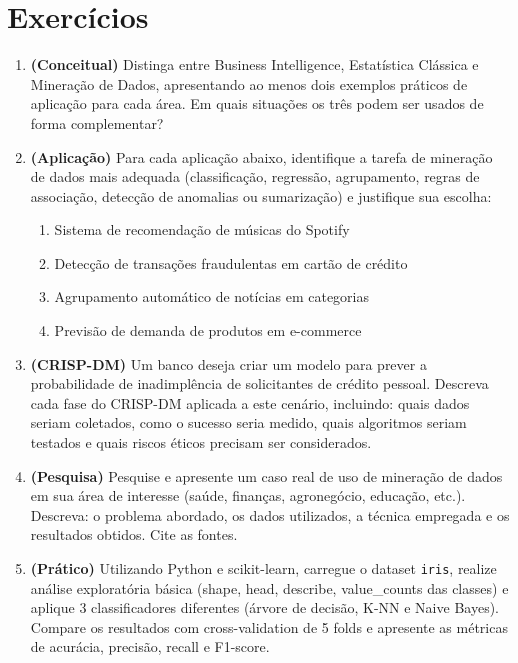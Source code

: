 \documentclass[12pt,a4paper]{article}
\begin{document}
\section{Exercícios}

\begin{enumerate}[leftmargin=*, label=\textbf{Exercício \arabic*.}]

  \item \textbf{(Conceitual)} Distinga entre Business Intelligence, Estatística Clássica e Mineração de Dados, apresentando ao menos dois exemplos práticos de aplicação para cada área. Em quais situações os três podem ser usados de forma complementar?

  \item \textbf{(Aplicação)} Para cada aplicação abaixo, identifique a tarefa de mineração de dados mais adequada (classificação, regressão, agrupamento, regras de associação, detecção de anomalias ou sumarização) e justifique sua escolha:
  \begin{enumerate}[label=(\alph*)]
    \item Sistema de recomendação de músicas do Spotify
    \item Detecção de transações fraudulentas em cartão de crédito
    \item Agrupamento automático de notícias em categorias
    \item Previsão de demanda de produtos em e-commerce
  \end{enumerate}

  \item \textbf{(CRISP-DM)} Um banco deseja criar um modelo para prever a probabilidade de inadimplência de solicitantes de crédito pessoal. Descreva cada fase do CRISP-DM aplicada a este cenário, incluindo: quais dados seriam coletados, como o sucesso seria medido, quais algoritmos seriam testados e quais riscos éticos precisam ser considerados.

  \item \textbf{(Pesquisa)} Pesquise e apresente um caso real de uso de mineração de dados em sua área de interesse (saúde, finanças, agronegócio, educação, etc.). Descreva: o problema abordado, os dados utilizados, a técnica empregada e os resultados obtidos. Cite as fontes.

  \item \textbf{(Prático)} Utilizando Python e scikit-learn, carregue o dataset \texttt{iris}, realize análise exploratória básica (shape, head, describe, value\_counts das classes) e aplique 3 classificadores diferentes (árvore de decisão, K-NN e Naive Bayes). Compare os resultados com cross-validation de 5 folds e apresente as métricas de acurácia, precisão, recall e F1-score.


\end{enumerate}
\end{document}
